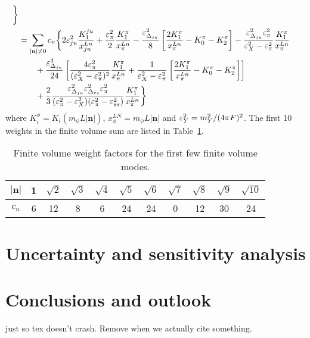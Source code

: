 \documentclass[prd,11pt,tightenlines,preprintnumbers,showpacs,superscriptaddress,notitlepage,nofootinbib,eqsecnum,floatfix]{revtex4-1}
\begin{document}
\begin{align}
	\bigg\}
\nonumber\\&= \sum_{|\mathbf{n}|\neq0} c_n \bigg\{
	2{\varepsilon}_{ju}^2\frac{K_1^{ju}}{x^{Ln}_{ju}}
	+\frac{{\varepsilon}_{\pi}^2}{2}\frac{K_1^\pi}{x^{Ln}_{\pi}}
	-\frac{{\varepsilon}_{{\Delta}_{ju}}^2}{8} \left[
		\frac{2K_1^\pi}{x^{Ln}_{\pi}}
		-K_0^\pi
		-K_2^\pi
	\right]
	-\frac{{\varepsilon}_{{\Delta}_{ju}}^2 {\varepsilon}_\pi^2}{{\varepsilon}_X^2-{\varepsilon}_\pi^2} \frac{K_1^\pi}{x^{Ln}_{\pi}}
\nonumber\\&\qquad 
	+\frac{{\varepsilon}_{{\Delta}_{ju}}^4}{24} \left[
	\frac{4{\varepsilon}_\pi^2}{({\varepsilon}_X^2-{\varepsilon}_\pi^2)^2} \frac{K_1^\pi}{x^{Ln}_{\pi}}
	+\frac{1}{{\varepsilon}_X^2 -{\varepsilon}_\pi^2} \left[
		\frac{2K_1^\pi}{x^{Ln}_{\pi}}
		-K_0^\pi
		-K_2^\pi
	\right]
	\right]
\nonumber\\&\qquad 
	+\frac{2}{3}\frac{{\varepsilon}_{{\Delta}_{ju}}^2{\varepsilon}_{{\Delta}_{rs}}^2 {\varepsilon}_\pi^2}{({\varepsilon}_\pi^2-{\varepsilon}_X^2)({\varepsilon}_\pi^2-{\varepsilon}_{ss}^2)}
	 \frac{K_1^\pi}{x^{Ln}_{\pi}}
	\bigg\}
\end{align}
where $K_i^\phi = K_i(m_\phi L |\mathbf{n}|)$, $x^{LN}_\phi = m_\phi L |\mathbf{n}|$ and ${\varepsilon}_Y^2 = m_Y^2 / (4\pi F)^2$.
The first 10 weights in the finite volume sum are listed in Table~\ref{tab:cn_weigths}.


\begin{table}
\begin{ruledtabular}
\begin{tabular}{c|cccccccccc}
$|\mathbf{n}|$& 1 & $\sqrt{2}$& $\sqrt{3}$& $\sqrt{4}$& $\sqrt{5}$& $\sqrt{6}$& $\sqrt{7}$& $\sqrt{8}$& $\sqrt{9}$& $\sqrt{10}$\\
\hline
$c_n$& 6&12& 8& 6& 24& 24& 0& 12& 30& 24
\end{tabular}
\end{ruledtabular}
\caption{\label{tab:cn_weigths}
Finite volume weight factors for the first few finite volume modes.
}
\end{table}


\section{Uncertainty and sensitivity analysis}

\section{Conclusions and outlook}


\citep{Aad:2012tfa} just so tex doesn't crash. Remove when we actually cite something.






\end{document}
